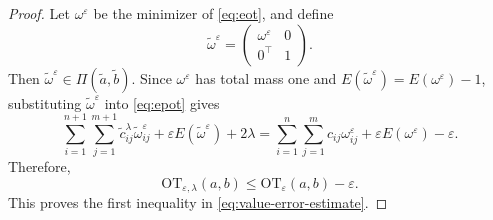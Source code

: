 \documentclass[a4paper,11pt]{article}
\numberwithin{equation}{section}
\newcommand{\eps}{\varepsilon}
\newcommand{\OT}{\mathrm{OT}}
\begin{document}
\begin{proof}
Let $\omega^\eps$ be the minimizer of \eqref{eq:eot}, and define
\begin{equation*}
  \widetilde\omega^\eps =
  \begin{pmatrix}
    \omega^\eps & 0\\
    0^\top & 1
  \end{pmatrix}.
\end{equation*}
Then $\widetilde\omega^\eps\in\Pi(\widetilde a,\widetilde b)$. Since $\omega^\eps$ has total mass one and $E(\widetilde\omega^\eps)=E(\omega^\eps)-1$, substituting $\widetilde\omega^\eps$ into \eqref{eq:epot} gives
\begin{equation*}
  \sum_{i = 1}^{n + 1}\sum_{j = 1}^{m + 1}\widetilde c^\lambda_{ij}\widetilde\omega^\eps_{ij} + \eps E(\widetilde\omega^\eps) + 2\lambda = \sum_{i = 1}^{n}\sum_{j = 1}^{m}c_{ij}\omega^\eps_{ij} + \eps E(\omega^\eps)-\eps.
\end{equation*}
Therefore,
\begin{equation}\label{eq:epot-upper-balanced}
  \OT_{\eps,\lambda}(a,b) \leq \OT_{\eps}(a,b)-\eps.
\end{equation}
This proves the first inequality in \eqref{eq:value-error-estimate}.


\end{proof}
\end{document}
